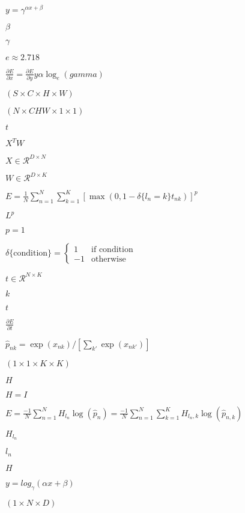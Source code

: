 \documentclass{article}
\begin{document}
$ y = \gamma ^ {\alpha x + \beta} $
\pagebreak

$ \beta $
\pagebreak

$ \gamma $
\pagebreak

$ e \approx 2.718 $
\pagebreak

$ \frac{\partial E}{\partial x} = \frac{\partial E}{\partial y} y \alpha \log_e(gamma) $
\pagebreak

$ (S \times C \times H \times W) $
\pagebreak

$ (N \times CHW \times 1 \times 1) $
\pagebreak

$ t $
\pagebreak

$ X^T W $
\pagebreak

$ X \in \mathcal{R}^{D \times N} $
\pagebreak

$ W \in \mathcal{R}^{D \times K} $
\pagebreak

$ E = \frac{1}{N} \sum\limits_{n=1}^N \sum\limits_{k=1}^K [\max(0, 1 - \delta\{l_n = k\} t_{nk})] ^ p $
\pagebreak

$ L^p $
\pagebreak

$ p = 1 $
\pagebreak

$ \delta\{\mathrm{condition}\} = \left\{ \begin{array}{lr} 1 & \mbox{if condition} \\ -1 & \mbox{otherwise} \end{array} \right. $
\pagebreak

$ t \in \mathcal{R}^{N \times K} $
\pagebreak

$k$
\pagebreak

$t$
\pagebreak

$ \frac{\partial E}{\partial t} $
\pagebreak

$ \hat{p}_{nk} = \exp(x_{nk}) / \left[\sum_{k'} \exp(x_{nk'})\right] $
\pagebreak

$ (1 \times 1 \times K \times K) $
\pagebreak

$ H $
\pagebreak

$ H = I $
\pagebreak

$ E = \frac{-1}{N} \sum\limits_{n=1}^N H_{l_n} \log(\hat{p}_n) = \frac{-1}{N} \sum\limits_{n=1}^N \sum\limits_{k=1}^{K} H_{l_n,k} \log(\hat{p}_{n,k}) $
\pagebreak

$ H_{l_n} $
\pagebreak

$l_n$
\pagebreak

$H$
\pagebreak

$ y = log_{\gamma}(\alpha x + \beta) $
\pagebreak

$ (1 \times N \times D) $
\pagebreak
\end{document}
